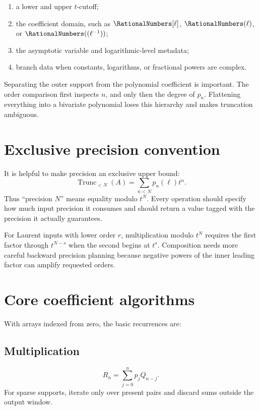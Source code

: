 \documentclass[11pt,oneside,openany]{book}
\newcommand{\TransseriesTruncateBelow}[2]{%
  \operatorname{Trunc}_{<#2}\!\left(#1\right)%
}
\begin{document}
\begin{enumerate}
\item a lower and upper \(t\)-cutoff;
\item the coefficient domain, such as \(\RationalNumbers[\ell]\),
\(\RationalNumbers(\ell)\), or \(\RationalNumbers((\ell^{-1}))\);
\item the asymptotic variable and logarithmic-level metadata;
\item branch data when constants, logarithms, or fractional powers are complex.
\end{enumerate}

Separating the outer support from the polynomial coefficient is important.
The order comparison first inspects \(n\), and only then the degree of
\(p_n\).  Flattening everything into a bivariate polynomial loses this
hierarchy and makes truncation ambiguous.

\section{Exclusive precision convention}
It is helpful to make precision an exclusive upper bound:
\begin{equation}\label{eq:exclusiveprecision}
 \TransseriesTruncateBelow{A}{N}=\sum_{n<N}p_n(\ell)t^n.
\end{equation}
Thus ``precision \(N\)'' means equality modulo \(t^N\).  Every operation should
specify how much input precision it consumes and should return a value tagged
with the precision it actually guarantees.

For Laurent inputs with lower order \(r\), multiplication modulo \(t^N\)
requires the first factor through \(t^{N-s}\) when the second begins at
\(t^s\).  Composition needs more careful backward precision planning because
negative powers of the inner leading factor can amplify requested orders.

\section{Core coefficient algorithms}
With arrays indexed from zero, the basic recurrences are:

\subsection{Multiplication}
\begin{equation}\label{eq:algmulcoeff}
 R_n=\sum_{j=0}^{n}p_jQ_{n-j}.
\end{equation}
For sparse supports, iterate only over present pairs and discard sums outside
the output window.
\end{document}
